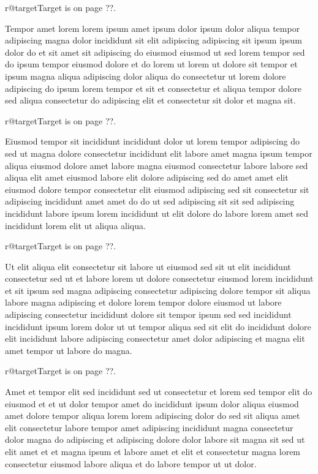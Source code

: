 \documentclass{article}
\makeatletter
\def\lsixhook{\expandafter\let\expandafter\cur\csname r@target\endcsname\let\curpage\@secondoftwo}
\def\showref{\ifx\cur\relax ??\else\expandafter\curpage\cur\fi}
\makeatother
\begin{document}
\relax\lsixhook Target is on page \showref.

Tempor amet lorem lorem ipsum amet ipsum dolor ipsum dolor aliqua tempor adipiscing magna dolor incididunt sit elit adipiscing adipiscing sit ipsum ipsum dolor do et sit amet sit adipiscing do eiusmod eiusmod ut sed lorem tempor sed do ipsum tempor eiusmod dolore et do lorem ut lorem ut dolore sit tempor et ipsum magna aliqua adipiscing dolor aliqua do consectetur ut lorem dolore adipiscing do ipsum lorem tempor et sit et consectetur et aliqua tempor dolore sed aliqua consectetur do adipiscing elit et consectetur sit dolor et magna sit.

\relax\lsixhook Target is on page \showref.

Eiusmod tempor sit incididunt incididunt dolor ut lorem tempor adipiscing do sed ut magna dolore consectetur incididunt elit labore amet magna ipsum tempor aliqua eiusmod dolore amet labore magna eiusmod consectetur labore labore sed aliqua elit amet eiusmod labore elit dolore adipiscing sed do amet amet elit eiusmod dolore tempor consectetur elit eiusmod adipiscing sed sit consectetur sit adipiscing incididunt amet amet do do ut sed adipiscing sit sit sed adipiscing incididunt labore ipsum lorem incididunt ut elit dolore do labore lorem amet sed incididunt lorem elit ut aliqua aliqua.

\relax\lsixhook Target is on page \showref.

Ut elit aliqua elit consectetur sit labore ut eiusmod sed sit ut elit incididunt consectetur sed ut et labore lorem ut dolore consectetur eiusmod lorem incididunt et sit ipsum sed magna adipiscing consectetur adipiscing dolore tempor sit aliqua labore magna adipiscing et dolore lorem tempor dolore eiusmod ut labore adipiscing consectetur incididunt dolore sit tempor ipsum sed sed incididunt incididunt ipsum lorem dolor ut ut tempor aliqua sed sit elit do incididunt dolore elit incididunt labore adipiscing consectetur amet dolor adipiscing et magna elit amet tempor ut labore do magna.

\relax\lsixhook Target is on page \showref.

Amet et tempor elit sed incididunt sed ut consectetur et lorem sed tempor elit do eiusmod et et ut dolor tempor amet do incididunt ipsum dolor aliqua eiusmod amet dolore tempor aliqua lorem lorem adipiscing dolor do sed sit aliqua amet elit consectetur labore tempor amet adipiscing incididunt magna consectetur dolor magna do adipiscing et adipiscing dolore dolor labore sit magna sit sed ut elit amet et et magna ipsum et labore amet et elit et consectetur magna lorem consectetur eiusmod labore aliqua et do labore tempor ut ut dolor.
\end{document}
